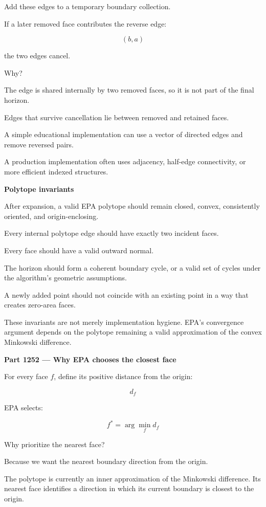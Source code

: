 Add these edges to a temporary boundary collection.

If a later removed face contributes the reverse edge:

\[
(b,a)
\]

the two edges cancel.

Why?

The edge is shared internally by two removed faces, so it is not part of the final horizon.

Edges that survive cancellation lie between removed and retained faces.

A simple educational implementation can use a vector of directed edges and remove reversed pairs.

A production implementation often uses adjacency, half-edge connectivity, or more efficient indexed structures.

\textbf{Polytope invariants}

After expansion, a valid EPA polytope should remain closed, convex, consistently oriented, and origin-enclosing.

Every internal polytope edge should have exactly two incident faces.

Every face should have a valid outward normal.

The horizon should form a coherent boundary cycle, or a valid set of cycles under the algorithm's geometric assumptions.

A newly added point should not coincide with an existing point in a way that creates zero-area faces.

These invariants are not merely implementation hygiene. EPA's convergence argument depends on the polytope remaining a valid approximation of the convex Minkowski difference.

\textbf{Part 1252 --- Why EPA chooses the closest face}

For every face \(f\), define its positive distance from the origin:

\[
d_f
\]

EPA selects:

\[
\boxed{ f^*=\arg\min_f d_f }
\]

Why prioritize the nearest face?

Because we want the nearest boundary direction from the origin.

The polytope is currently an inner approximation of the Minkowski difference. Its nearest face identifies a direction in which its current boundary is closest to the origin.

